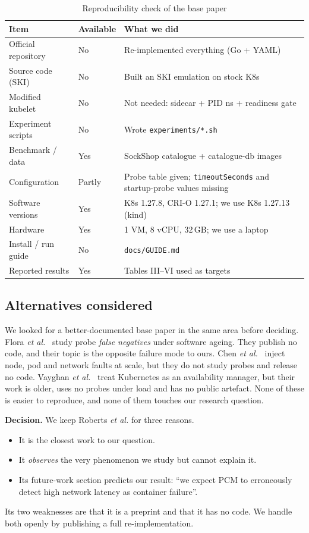 \documentclass[conference]{IEEEtran}
\begin{document}
\begin{table}[t]
\centering
\caption{Reproducibility check of the base paper}
\label{tab:repro-check}
\footnotesize
\begin{tabular}{@{}p{2.3cm}p{1.1cm}p{4.1cm}@{}}
\toprule
Item & Available & What we did \\
\midrule
Official repository & No & Re-implemented everything (Go + YAML) \\
Source code (SKI) & No & Built an SKI emulation on stock K8s \\
Modified kubelet & No & Not needed: sidecar + PID ns + readiness gate \\
Experiment scripts & No & Wrote \texttt{experiments/*.sh} \\
Benchmark / data & Yes & SockShop catalogue + catalogue-db images \\
Configuration & Partly & Probe table given; \texttt{timeoutSeconds} and startup-probe values missing \\
Software versions & Yes & K8s 1.27.8, CRI-O 1.27.1; we use K8s 1.27.13 (kind) \\
Hardware & Yes & 1 VM, 8 vCPU, 32\,GB; we use a laptop \\
Install / run guide & No & \texttt{docs/GUIDE.md} \\
Reported results & Yes & Tables III--VI used as targets \\
\bottomrule
\end{tabular}
\end{table}

\subsection{Alternatives considered}
We looked for a better-documented base paper in the same area before
deciding. Flora \emph{et al.}~\cite{flora2022} study probe
\emph{false negatives} under software ageing. They publish no code, and
their topic is the opposite failure mode to ours. Chen
\emph{et al.}~\cite{chen2025} inject node, pod and network faults at
scale, but they do not study probes and release no code. Vayghan
\emph{et al.}~\cite{vayghan2019} treat Kubernetes as an availability
manager, but their work is older, uses no probes under load and has no
public artefact. None of these is easier to reproduce, and none of them
touches our research question.

\textbf{Decision.} We keep Roberts \emph{et al.} for three reasons.
\begin{itemize}
\item It is the closest work to our question.
\item It \emph{observes} the very phenomenon we study but cannot explain
  it.
\item Its future-work section predicts our result: ``we expect PCM to
  erroneously detect high network latency as container failure''.
\end{itemize}
Its two weaknesses are that it is a preprint and that it has no code. We
handle both openly by publishing a full re-implementation.
\end{document}
